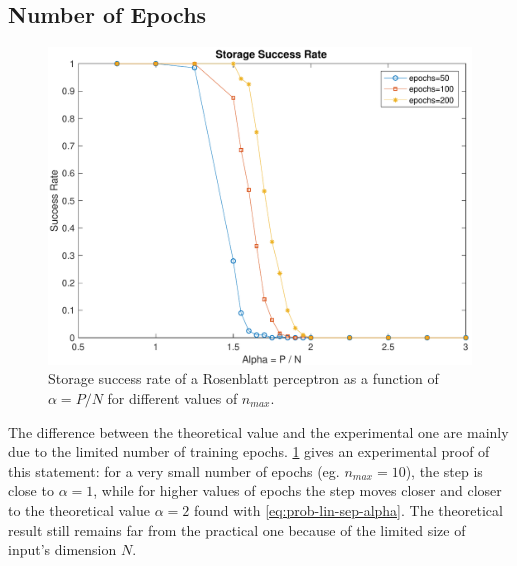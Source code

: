 \subsection{Number of Epochs}
\label{subsec:epochs}
\begin{figure}[t]
	\centering
	\includegraphics[width=\columnwidth]{figures/multiple_epochs}
    \caption{Storage success rate of a Rosenblatt perceptron as a function of $\alpha = P / N$ for different values of $n_{max}$.}
	\label{fig:multiple_epochs}
\end{figure}

The difference between the theoretical value and the experimental one are mainly due to the limited number of training epochs.
\cref{fig:multiple_epochs} gives an experimental proof of this statement:
for a very small number of epochs (eg. $n_{max} = 10$), the step is close to $\alpha = 1$, while for higher values of epochs the step moves closer and closer to the theoretical value $\alpha = 2$ found with \cref{eq:prob-lin-sep-alpha}.
The theoretical result still remains far from the practical one because of the limited size of input's dimension $N$.

